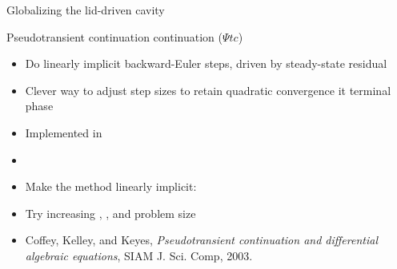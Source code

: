\begin{frame}{Globalizing the lid-driven cavity}
  \begin{block}{Pseudotransient continuation continuation ($\Psi tc$)}
    \begin{itemize}
    \item Do linearly implicit backward-Euler steps, driven by
      steady-state residual
    \item Clever way to adjust step sizes to retain quadratic
      convergence it terminal phase
    \end{itemize}
  \end{block}
  \begin{itemize}
  \item Implemented in 
  \item {}
  \item Make the method linearly implicit: 
  \item Try increasing , , and problem size
  \item Coffey, Kelley, and Keyes, \emph{Pseudotransient continuation and differential algebraic equations}, SIAM J. Sci. Comp, 2003.
  \end{itemize}
\end{frame}
